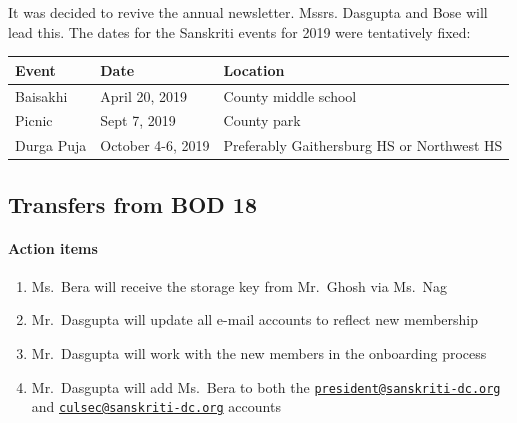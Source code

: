 \documentclass[12pt,]{article}
\providecommand{\tightlist}{%
  \setlength{\itemsep}{0pt}\setlength{\parskip}{0pt}}
\let\oldparagraph\paragraph
\renewcommand{\paragraph}[1]{\oldparagraph{#1}\mbox{}}
\begin{document}
It was decided to revive the annual newsletter. Mssrs. Dasgupta and Bose
will lead this. The dates for the Sanskriti events for 2019 were
tentatively fixed:

\begin{longtable}[]{@{}lll@{}}
\toprule
Event & Date & Location\tabularnewline
\midrule
\endhead
Baisakhi & April 20, 2019 & County middle school\tabularnewline
Picnic & Sept 7, 2019 & County park\tabularnewline
Durga Puja & October 4-6, 2019 & Preferably Gaithersburg HS or Northwest
HS\tabularnewline
\bottomrule
\end{longtable}

\hypertarget{transfers-from-bod-18}{%
\subsection{Transfers from BOD 18}\label{transfers-from-bod-18}}

\hypertarget{action-items-5}{%
\paragraph{Action items}\label{action-items-5}}

\begin{enumerate}
\def\labelenumi{\arabic{enumi}.}
\tightlist
\item
  Ms.~Bera will receive the storage key from Mr.~Ghosh via Ms.~Nag
\item
  Mr.~Dasgupta will update all e-mail accounts to reflect new membership
\item
  Mr.~Dasgupta will work with the new members in the onboarding process
\item
  Mr.~Dasgupta will add Ms.~Bera to both the
  \href{mailto:president@sanskriti-dc.org}{\nolinkurl{president@sanskriti-dc.org}}
  and
  \href{mailto:culsec@sanskriti-dc.org}{\nolinkurl{culsec@sanskriti-dc.org}}
  accounts
\end{enumerate}
\end{document}
